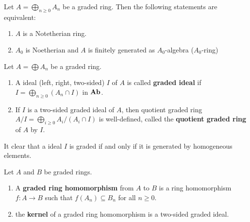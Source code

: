 \begin{proposition}
    \label{pro:Noetherian of graded ring}
    Let $A=\bigoplus_{n\geq 0} A_n$ be a graded ring. Then the following statements are equivalent:
    \begin{enumerate}
        \item
              $A$ is a Notetherian ring.
        \item
              $A_0$ is Noetherian and $A$ is finitely generated as $A_0$-algebra ($A_0$-ring)
    \end{enumerate}
\end{proposition}


\begin{definition}
    Let $A=\bigoplus A_n$ be a graded ring.
    \begin{enumerate}
        \item
              A ideal (left, right, two-sided) $I$ of $A$ is called \textbf{graded ideal} if $I=\bigoplus_{n\geq 0} (A_n \cap I)$ in $\mathbf{Ab}$.
        \item
              If $I$ is a two-sided graded ideal of $A$, then quotient graded ring $A/I=\bigoplus_{i\geq 0} A_i/\left(A_i\cap I\right)$ is well-defined, called the \textbf{quotient graded ring} of $A$ by $I$.
    \end{enumerate}
    \begin{remark}
        It clear that a ideal $I$ is graded if and only if it is generated by homogeneous elements.
    \end{remark}
\end{definition}

\begin{definition}
    Let $A$ and $B$ be graded rings.
    \begin{enumerate}
        \item
              A \textbf{graded ring homomorphism} from $A$ to $B$ is a ring homomorphism $f: A \rightarrow B$ such that $f\left(A_n\right) \subseteq B_n$ for all $n \geqslant 0$.
        \item
              the \textbf{kernel} of a graded ring homomorphism is a two-sided graded ideal.
    \end{enumerate}
\end{definition}


